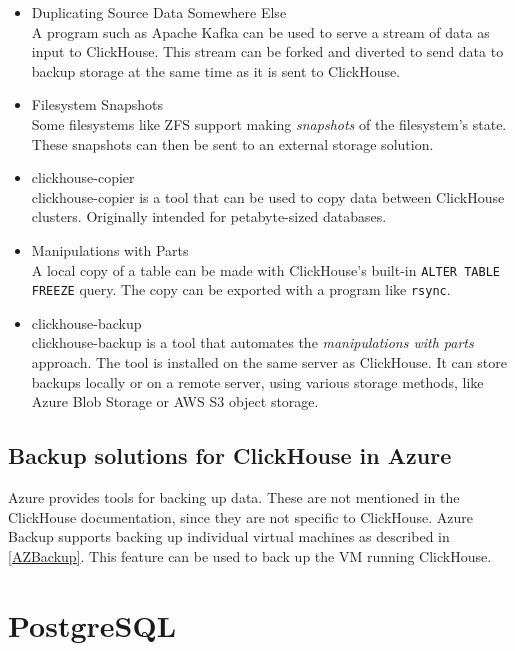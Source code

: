 \begin{itemize}
    \item Duplicating Source Data Somewhere Else \\
    A program such as Apache Kafka can be used to serve a stream of data as input to ClickHouse.
    This stream can be forked and diverted to send data to backup storage at the same time as it is sent to ClickHouse.
    \item Filesystem Snapshots \\
    Some filesystems like ZFS support making \emph{snapshots} of the filesystem's state.
    These snapshots can then be sent to an external storage solution.
    \item clickhouse-copier \\
    clickhouse-copier is a tool that can be used to copy data between ClickHouse clusters.
    Originally intended for petabyte-sized databases.
    \item Manipulations with Parts \\
    A local copy of a table can be made with ClickHouse's built-in \texttt{ALTER TABLE FREEZE} query.
    The copy can be exported with a program like \texttt{rsync}.
    \item clickhouse-backup  \label{theory:chbk} \\
    clickhouse-backup is a tool that automates the \emph{manipulations with parts} approach.
    The tool is installed on the same server as ClickHouse.
    It can store backups locally or on a remote server, using various storage methods,
    like Azure Blob Storage or AWS S3 object storage.
\end{itemize}

\subsection{Backup solutions for ClickHouse in Azure}

Azure provides tools for backing up data.
These are not mentioned in the ClickHouse documentation,
since they are not specific to ClickHouse.
Azure Backup supports backing up individual virtual machines as described in \ref{AZBackup}.
This feature can be used to back up the VM running ClickHouse.


\section{PostgreSQL} \label{Postgres}

